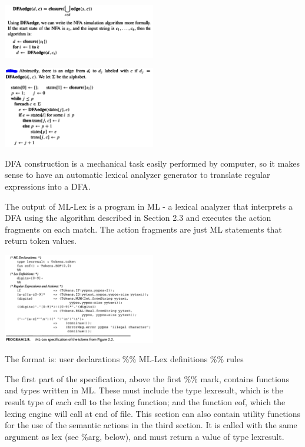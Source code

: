 \documentclass[8pt, a4paper, oneside, twocolumn]{extarticle}
\begin{document}
\includegraphics[width=0.5\textwidth,height=0.5\textheight,keepaspectratio]{nfa1}

\includegraphics[width=0.5\textwidth,height=0.5\textheight,keepaspectratio]{nfa2}

DFA construction is a mechanical task easily performed by computer, so it 
makes sense to have an automatic lexical analyzer generator to translate  
regular expressions into a DFA. 


The output of ML-Lex is a program in ML - a lexical analyzer that  
interprets a DFA using the algorithm described in Section 2.3 and executes the 
action fragments on each match. The action fragments are just ML statements 
that return token values. 

\includegraphics[width=0.5\textwidth,height=0.5\textheight,keepaspectratio]{lex}

The format is: user declarations \%\% ML-Lex definitions \%\% rules

The first part of the specification, above the first \%\% mark, contains  
functions and types written in ML. These must include the type lexresult, 
which is the result type of each call to the lexing function; and the  
function eof, which the lexing engine will call at end of file. This section can 
also contain utility functions for the use of the semantic actions in the third 
section. It is called with the same argument as lex (see \%arg, below), and must return a value of type lexresult. 
\end{document}
